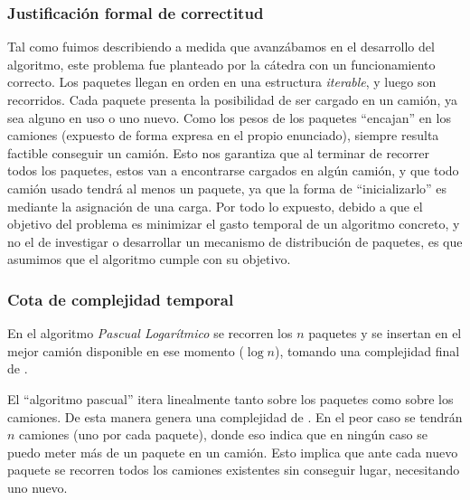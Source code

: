 \documentclass[11pt, a4paper, twoside]{article}
\begin{document}
\subsubsection{Justificación formal de correctitud}

Tal como fuimos describiendo a medida que avanzábamos en el desarrollo del algoritmo,
este problema fue planteado por la cátedra con un funcionamiento correcto. Los paquetes
llegan en orden en una estructura \emph{iterable}, y luego son recorridos. Cada paquete 
presenta la posibilidad de ser cargado en un camión, ya sea alguno en uso o uno nuevo. 
Como los pesos de los paquetes \enquote{encajan} en los camiones (expuesto de forma
expresa en el propio enunciado), siempre resulta factible conseguir un camión. Esto 
nos garantiza que al terminar de recorrer todos los paquetes, estos van a
encontrarse cargados en algún camión, y que todo camión usado tendrá al menos 
un paquete, ya que la forma de \enquote{inicializarlo} es mediante la asignación de una 
carga. Por todo lo expuesto, debido a que el objetivo del problema es minimizar el
gasto temporal de un algoritmo concreto, y no el de investigar o desarrollar un
mecanismo de distribución de paquetes, es que asumimos que el algoritmo cumple
con su objetivo.

\subsubsection{Cota de complejidad temporal}

En el algoritmo \textit{Pascual Logarítmico} se recorren los $n$ paquetes y se
insertan en el mejor camión disponible en ese momento ($\log n$),
tomando una complejidad final de .

El \enquote{algoritmo pascual} itera linealmente tanto sobre los paquetes como
sobre los camiones. De esta manera genera una complejidad de .
En el peor caso se tendrán $n$ camiones (uno por cada paquete),
donde eso indica que en ningún caso se puedo meter más de un paquete en un camión.
Esto implica que ante cada nuevo paquete se recorren todos los camiones existentes sin
conseguir lugar, necesitando uno nuevo.
\end{document}
